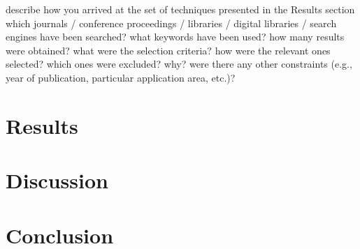 \documentclass[12pt,a4paper,titlepage,oneside]{scrartcl}
\begin{document}
describe how you arrived at the set of techniques presented in the Results section
which journals / conference proceedings / libraries / digital libraries / search engines have been searched?
what keywords have been used?
how many results were obtained?
what were the selection criteria? how were the relevant ones selected?
which ones were excluded? why?
were there any other constraints (e.g., year of publication, particular application area, etc.)?

\newpage
\section{Results}
\newpage
\section{Discussion}
\newpage
\section{Conclusion}
\newpage




\end{document}
